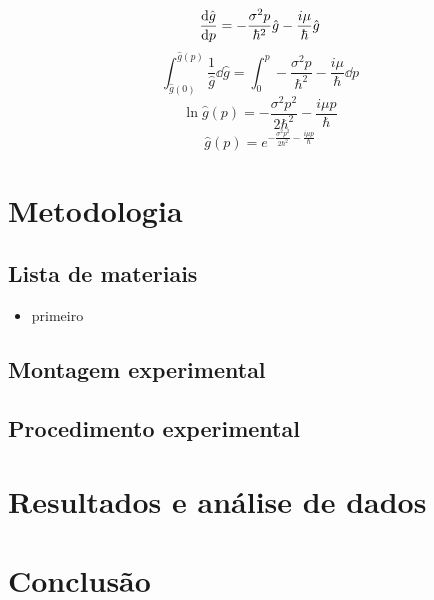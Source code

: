 \documentclass[report,14pt,openright,oneside,a4paper,brazil]{abntex2}
\begin{document}
\begin{equation}
    \dv{\hat g}{p} = -\frac{\sigma^2p}{\hbar^2} \hat{g}-\frac{i\mu}{\hbar} \hat g
\end{equation}
\begin{equation}
    \int_{\hat{g}(0)}^{\hat{g}(p)} \frac{1}{\hat g} \dd{\hat g} = \int_0^p -\frac{\sigma^2p}{\hbar^2} -\frac{i\mu}{\hbar} \dd{p} 
\end{equation}
\begin{equation}
    \ln {\hat g(p)} = -\frac{\sigma^2p^2}{2\hbar^2} -\frac{i\mu p}{\hbar} 
\end{equation}
\begin{equation}
    \hat g(p) = e^{-\frac{\sigma^2p^2}{2\hbar^2} -\frac{i\mu p}{\hbar}} 
\end{equation}

\chapter{Metodologia}

\section{Lista de materiais}

\begin{itemize}
    \item primeiro
\end{itemize}

\section{Montagem experimental}

\section{Procedimento experimental}

\chapter{Resultados e análise de dados}

\chapter{Conclusão}

\newpage
\appendix

\newpage



\nocite{*}
\end{document}
